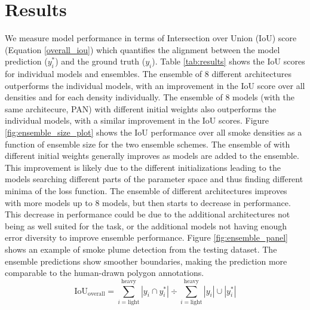 \documentclass{article}
\begin{document}
\section{Results}
We measure model performance in terms of Intersection over Union (IoU)  score (Equation \ref{overall_iou}) which quantifies the alignment between the model prediction ($ y^*_{i} $) and the ground truth ($y_{i}$). Table \ref{tab:results} shows the IoU scores for individual models and ensembles. The ensemble of 8 different architectures outperforms the individual models, with an improvement in the IoU score over all densities and for each density individually. The ensemble of 8 models (with the same architecure, PAN) with different initial weights also outperforms the individual models, with a similar improvement in the IoU scores. Figure \ref{fig:ensemble_size_plot} shows the IoU performance over all smoke densities as a function of ensemble size for the two ensemble schemes. The ensemble of with different initial weights generally improves as models are added to the ensemble. This improvement is likely due to the different initializations leading to the models searching different parts of the parameter space and thus finding different minima of the loss function. The ensemble of different architectures improves with more models up to 8 models, but then starts to decrease in performance. This decrease in performance could be due to the additional architectures not being as well suited for the task, or the additional models not having enough error diversity to improve ensemble performance.
Figure \ref{fig:ensemble_panel}  shows an example of smoke plume detection from the testing dataset. The ensemble predictions show smoother boundaries, making the prediction more comparable to the human-drawn polygon annotations.
\begin{equation} \label{overall_iou}
    \text{IoU}_{\text{overall}} = {\sum\limits_{i=\text{light}}^{\text{heavy}}|y_{i}\cap y^*_{i}|} \div {\sum\limits_{i=\text{light}}^{\text{heavy}}|y_{i}|\cup|y^*_{i}|}
\end{equation}
\end{document}
